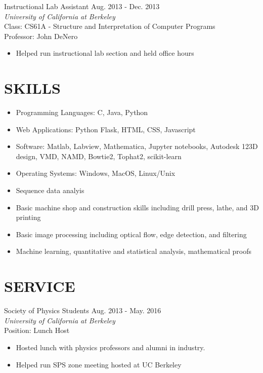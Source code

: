 \documentclass[margin, 10pt]{res} %
\begin{document}
\begin{resume}
Instructional Lab Assistant \hfill Aug. 2013 - Dec. 2013\\
{\sl University of California at Berkeley} \\
{\normalfont Class: CS61A - Structure and Interpretation of Computer Programs}\\
{\normalfont Professor: John DeNero}

\begin{itemize}
\item {\normalfont Helped run instructional lab section and held office hours}
\end{itemize}

\section{SKILLS}
\begin{itemize}
\item {\normalfont Programming Languages: C, Java, Python}
\item {\normalfont Web Applications: Python Flask, HTML, CSS, Javascript}
\item {\normalfont Software: Matlab, Labview, Mathematica, Jupyter notebooks, Autodesk 123D design, VMD, NAMD, Bowtie2, Tophat2, scikit-learn}
\item {\normalfont Operating Systems: Windows, MacOS, Linux/Unix}
\item {\normalfont Sequence data analyis}
\item {\normalfont Basic machine shop and construction skills including drill press, lathe, and 3D printing}
\item {\normalfont Basic image processing including optical flow, edge detection, and filtering}
\item {\normalfont Machine learning, quantitative and statistical analysis, mathematical proofs}
\end{itemize}


\section{SERVICE}

Society of Physics Students \hfill Aug. 2013 - May. 2016 \\
{\sl University of California at Berkeley} \\
{\normalfont Position: Lunch Host}
\begin{itemize}
\item {\normalfont Hosted lunch with physics professors and alumni in industry.}
\item {\normalfont Helped run SPS zone meeting hosted at UC Berkeley}
\end{itemize}


\end{resume}
\end{document}
